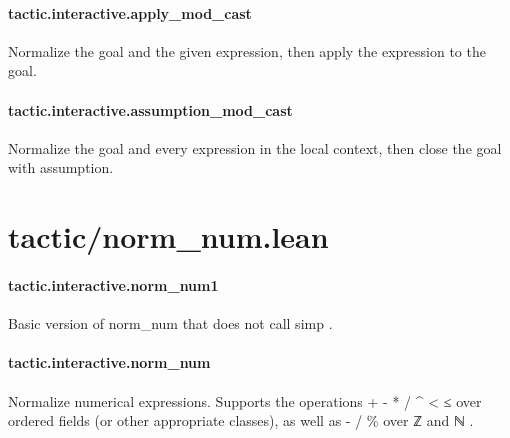 \documentclass{article}
\begin{document}
\paragraph{tactic.interactive.apply\_mod\_cast}
\par
Normalize the goal and the given expression,
then apply the expression to the goal.
\paragraph{tactic.interactive.assumption\_mod\_cast}
\par
Normalize the goal and every expression in the local context,
then close the goal with assumption.
\section{tactic/norm\_num.lean}\paragraph{tactic.interactive.norm\_num1}
\par
Basic version of 
\colorbox[RGB]{253,246,227}{{{{\color[RGB]{101, 123, 131} norm\_num }}}} that does not call 
\colorbox[RGB]{253,246,227}{{{{\color[RGB]{101, 123, 131} simp }}}}.
\paragraph{tactic.interactive.norm\_num}
\par
Normalize numerical expressions. Supports the operations
\colorbox[RGB]{253,246,227}{{{{\color[RGB]{181, 137, 0} + }}}} 
\colorbox[RGB]{253,246,227}{{{{\color[RGB]{181, 137, 0} - }}}} 
\colorbox[RGB]{253,246,227}{{{{\color[RGB]{181, 137, 0} * }}}} 
\colorbox[RGB]{253,246,227}{{{{\color[RGB]{181, 137, 0} / }}}} 
\colorbox[RGB]{253,246,227}{{{{\color[RGB]{101, 123, 131} \textasciicircum{} }}}} 
\colorbox[RGB]{253,246,227}{{{{\color[RGB]{181, 137, 0} < }}}} 
\colorbox[RGB]{253,246,227}{{{{\color[RGB]{181, 137, 0} ≤ }}}} over ordered fields (or other
appropriate classes), as well as 
\colorbox[RGB]{253,246,227}{{{{\color[RGB]{181, 137, 0} - }}}} 
\colorbox[RGB]{253,246,227}{{{{\color[RGB]{181, 137, 0} / }}}} 
\colorbox[RGB]{253,246,227}{{{{\color[RGB]{101, 123, 131} \% }}}} over 
\colorbox[RGB]{253,246,227}{{{{\color[RGB]{101, 123, 131} ℤ }}}} and 
\colorbox[RGB]{253,246,227}{{{{\color[RGB]{101, 123, 131} ℕ }}}}.
\end{document}
